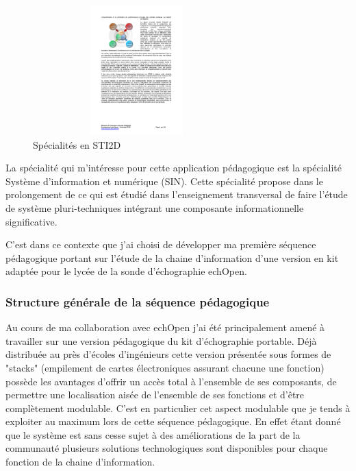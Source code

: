 \documentclass[12pt]{article}
\begin{document}
\begin{figure}
  \vspace{-50pt}
  \hspace{-0pt}
  \begin{center}
    \includegraphics[width=8cm,height=5cm,trim=3cm 19.8cm 10cm 3.3cm, clip=true]{Images_Rapport/specialite}
  \end{center}
  \vspace{-5pt}
  \caption{Spécialités en STI2D}
  \vspace{-10pt}
\end{figure}

\vspace{30pt}
La spécialité qui m'intéresse pour cette application pédagogique est la spécialité Système d'information et numérique (SIN). Cette spécialité propose dans le prolongement de ce qui est étudié dans l'enseignement transversal de faire l'étude de système pluri-techniques intégrant une composante informationnelle significative.\par
\vspace{60pt}


C'est dans ce contexte que j'ai choisi de développer ma première séquence pédagogique portant sur l'étude de la chaine d'information d'une version en kit adaptée pour le lycée de la sonde d'échographie echOpen.

\newpage
\subsubsection{Structure générale de la séquence pédagogique}

Au cours de ma collaboration avec echOpen j'ai été principalement amené à travailler sur une version pédagogique du kit d'échographie portable. Déjà distribuée au près d'écoles d'ingénieurs cette version présentée sous formes de "stacks" (empilement de cartes électroniques assurant chacune une fonction) possède les avantages d'offrir un accès total à l'ensemble de ses composants, de permettre une localisation aisée de l'ensemble de ses fonctions et d'être complètement modulable. C'est en particulier cet aspect modulable que je tends à exploiter au maximum lors de cette séquence pédagogique. En effet étant donné que le système est sans cesse sujet à des améliorations de la part de la communauté plusieurs solutions technologiques sont disponibles pour chaque fonction de la chaine d'information. \par
\end{document}
